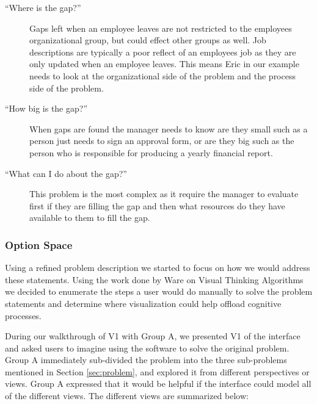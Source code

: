 \documentclass[journal]{vgtc}                %
\begin{document}
\begin{description}


  	\item [``Where is the gap?''] Gaps left when an employee leaves are not restricted to the employees organizational group, but could effect other groups as well.  Job descriptions are typically a poor reflect of an employees job as they are only updated when an employee leaves.  This means Eric in our example needs to look at the organizational side of the problem and the process side of the problem.
	\item [``How big is the gap?''] When gaps are found the manager needs to know are they small such as a person just needs to sign an approval form, or are they big such as the person who is responsible for producing a yearly financial report.

	\item [``What can I do about the gap?''] This problem is the most complex as it require the manager to evaluate first if they are filling the gap and then what resources do they have available to them to fill the gap.
\end{description}

\subsubsection{Option Space}
Using a refined problem description we started to focus on how we would address these statements.  Using the work done by Ware on Visual Thinking Algorithms~\cite[Chapter 11]{ware2012information} we decided to enumerate the steps a user would do manually to solve the problem statements and determine where visualization could help offload cognitive processes.

During our walkthrough of V1 with Group A, we presented V1 of the interface and asked users to imagine using the software to solve the original problem. Group A immediately sub-divided the problem into the three sub-problems mentioned in Section \ref{sec:problem}, and explored it from different perspectives or views. Group A expressed that it would be helpful if the interface could model all of the different views. The different views are summarized below:
\end{document}
